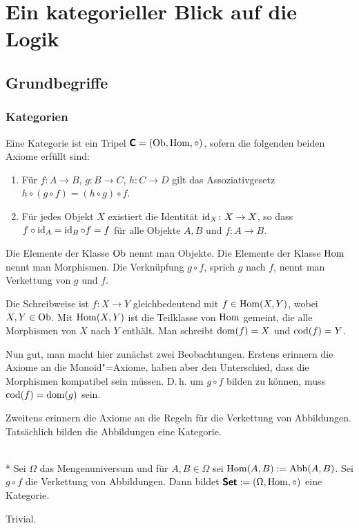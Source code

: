 
\chapter{Ein kategorieller Blick auf die Logik}

\section{Grundbegriffe}

\subsection{Kategorien}

\begin{Definition}[Kategorie]
Eine Kategorie ist ein Tripel $\textsf{\textbf{C}} = (\operatorname{Ob},\operatorname{Hom},{\circ})$,
sofern die folgenden beiden Axiome erfüllt sind:
\begin{enumerate}
\item Für $f\colon A\to B$, $g\colon B\to C$, $h\colon C\to D$ gilt
das Assoziativgesetz\\
$h\circ (g\circ f) = (h\circ g)\circ f$.
\item Für jedes Objekt $X$ existiert die Identität $\operatorname{id}_X\colon X\to X$,
so dass $f\circ\operatorname{id}_A = \operatorname{id}_B\circ f=f$ für alle Objekte $A,B$
und $f\colon A\to B$.
\end{enumerate}
\end{Definition}
Die Elemente der Klasse $\operatorname{Ob}$ nennt man Objekte. Die
Elemente der Klasse $\operatorname{Hom}$ nennt man Morphismen. Die
Verknüpfung $g\circ f$, sprich $g$ nach $f$, nennt man Verkettung
von $g$ und $f$.

Die Schreibweise ist $f\colon X\to Y$ gleichbedeutend mit
$f\in\operatorname{Hom}(X,Y)$, wobei $X,Y\in\operatorname{Ob}$.
Mit $\operatorname{Hom}(X,Y)$ ist die Teilklasse von
$\operatorname{Hom}$ gemeint, die alle Morphismen von $X$ nach $Y$
enthält. Man schreibt $\operatorname{dom}(f) = X$ und $\operatorname{cod}(f) = Y$.

Nun gut, man macht hier zunächst zwei Beobachtungen. Erstens
erinnern die Axiome an die Monoid"=Axiome, haben aber den Unterschied,
dass die Morphismen kompatibel sein müssen. D.\,h. um $g\circ f$
bilden zu können, muss $\operatorname{cod}(f)=\operatorname{dom}(g)$ sein.

Zweitens erinnern die Axiome an die Regeln für die Verkettung
von Abbildungen. Tatsächlich bilden die Abbildungen eine Kategorie.

\begin{Satz}\mbox{}\\*
Sei $\Omega$ das Mengenuniversum und für $A,B\in\Omega$ sei
$\operatorname{Hom}(A,B):=\operatorname{Abb}(A,B)$. Sei $g\circ f$ die Verkettung
von Abbildungen. Dann bildet $\textsf{\textbf{Set}}:=(\Omega,\operatorname{Hom},\circ)$
eine Kategorie.
\end{Satz}
 Trivial.\;\qedsymbol

